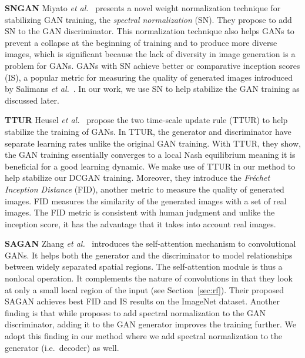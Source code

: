 \documentclass[a4paper,12pt]{report}
\begin{document}
\par \textbf{SNGAN} Miyato \textit{et al.}~\cite{SNGAN} presents a novel weight normalization technique for stabilizing GAN training, the \textit{spectral normalization} (SN). They propose to add SN to the GAN discriminator. This normalization technique also helps GANs to prevent a collapse at the beginning of training and to produce more diverse images, which is significant because the lack of diversity in image generation is a problem for GANs. GANs with SN achieve better or comparative inception scores (IS), a popular metric for measuring the quality of generated images introduced by Salimans \textit{et al.}~\cite{ImprTechn4TrainGANs}. In our work, we use SN to help stabilize the GAN training as discussed later.

\par \textbf{TTUR} Heusel \textit{et al.}~\cite{TTUR} propose the two time-scale
update rule (TTUR) to help stabilize the training of GANs. In TTUR, the generator and discriminator have separate learning rates unlike the original GAN training. With TTUR, they show, the GAN training essentially converges to a local Nash equilibrium meaning it is beneficial for a good learning dynamic. We make use of TTUR in our method to help stabilize our DCGAN training. Moreover, they introduce the \textit{Fréchet Inception Distance} (FID), another metric to measure the quality of generated images. FID measures the similarity of the generated images with a set of real images. The FID metric is consistent with human judgment and unlike the inception score, it has the advantage that it takes into account real images.

\par \textbf{SAGAN} Zhang \textit{et al.}~\cite{SAGAN} introduces the self-attention mechanism to convolutional GANs. It helps both the generator and the discriminator to model relationships between widely separated spatial regions. The self-attention module is thus a nonlocal operation. It complements the nature of convolutions in that they look at only a small local region of the input (see Section~\ref{sec:rf}). Their proposed SAGAN achieves best FID and IS results on the ImageNet dataset. Another finding is that while \cite{SNGAN} proposes to add spectral normalization to the GAN discriminator, adding it to the GAN generator improves the training further. We adopt this finding in our method where we add spectral normalization to the generator (i.e.\ decoder) as well. 
\end{document}
